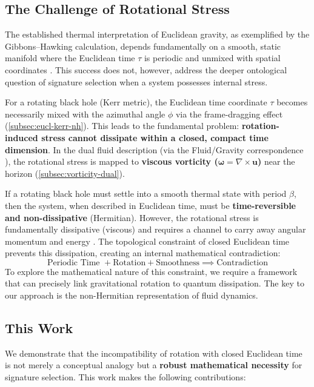 \documentclass[11pt]{article}
\begin{document}
\subsection{The Challenge of Rotational Stress}

The established thermal interpretation of Euclidean gravity, as exemplified by the Gibbons--Hawking calculation, depends fundamentally on a smooth, static manifold where the Euclidean time $\tau$ is periodic and unmixed with spatial coordinates \cite{GibbonsHawking1977}.
This success does not, however, address the deeper ontological question of signature selection when a system possesses internal stress.

For a rotating black hole (Kerr metric\cite{Kerr1963}), the Euclidean time coordinate $\tau$ becomes necessarily mixed with the azimuthal angle $\phi$ via the frame-dragging effect (\autoref{subsec:eucl-kerr-nh}). This leads to the fundamental problem: \textbf{rotation-induced stress cannot dissipate within a closed, compact time dimension}. In the dual fluid description (via the Fluid/Gravity correspondence \cite{FluidGravity2008}), the rotational stress is mapped to \textbf{viscous vorticity ($\mathbf{\omega} = \nabla \times \mathbf{u}$)} near the horizon (\autoref{subsec:vorticity-dual}).

If a rotating black hole must settle into a smooth thermal state with period $\beta$, then the system, when described in Euclidean time, must be \textbf{time-reversible and non-dissipative} (Hermitian). However, the rotational stress is fundamentally dissipative (viscous) and requires a channel to carry away angular momentum and energy \cite{Hawking1975}. The topological constraint of closed Euclidean time prevents this dissipation, creating an internal mathematical contradiction:
\[
    \text{Periodic Time } + \text{Rotation} + \text{Smoothness} \implies \text{Contradiction}
\]
To explore the mathematical nature of this constraint, we require a framework that can precisely link gravitational rotation to quantum dissipation. The key to our approach is the non-Hermitian representation of fluid dynamics.

\subsection{This Work}

We demonstrate that the incompatibility of rotation with closed Euclidean time is not merely a conceptual analogy but a \textbf{robust mathematical necessity} for signature selection. This work makes the following contributions:
\end{document}
